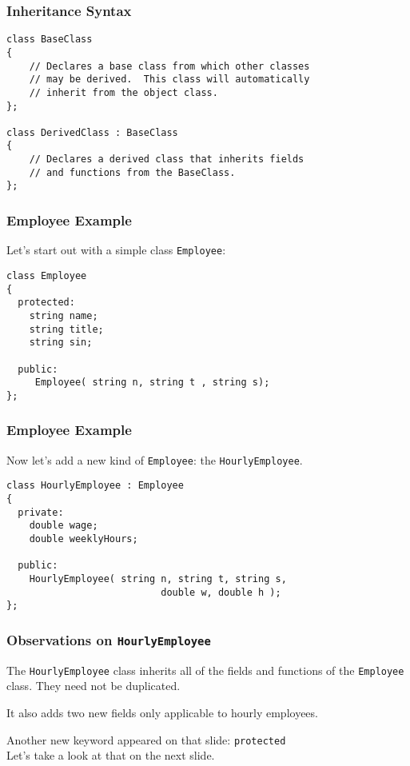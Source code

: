 \begin{frame}[fragile]
\frametitle{Inheritance Syntax}

\begin{verbatim}
class BaseClass
{
    // Declares a base class from which other classes 
    // may be derived.  This class will automatically
    // inherit from the object class.
};

class DerivedClass : BaseClass
{
    // Declares a derived class that inherits fields 
    // and functions from the BaseClass.
};

\end{verbatim}

\end{frame}

\begin{frame}[fragile]
\frametitle{Employee Example}

Let's start out with a simple class \texttt{Employee}:

\begin{verbatim}
class Employee
{
  protected:
    string name;
    string title;
    string sin;

  public:
     Employee( string n, string t , string s);
};
\end{verbatim}

\end{frame}


\begin{frame}[fragile]
\frametitle{Employee Example}

Now let's add a new kind of \texttt{Employee}: the \texttt{HourlyEmployee}.

\begin{verbatim}
class HourlyEmployee : Employee
{
  private:
    double wage;
    double weeklyHours;

  public:
    HourlyEmployee( string n, string t, string s,
                           double w, double h );
};
\end{verbatim}

\end{frame}

\begin{frame}
\frametitle{Observations on \texttt{HourlyEmployee}}

The \texttt{HourlyEmployee} class inherits all of the fields and functions of the \texttt{Employee} class. They need not be duplicated.

It also adds two new fields only applicable to hourly employees.

Another new keyword appeared on that slide: \texttt{protected}\\
\quad Let's take a look at that on the next slide.

\end{frame}

